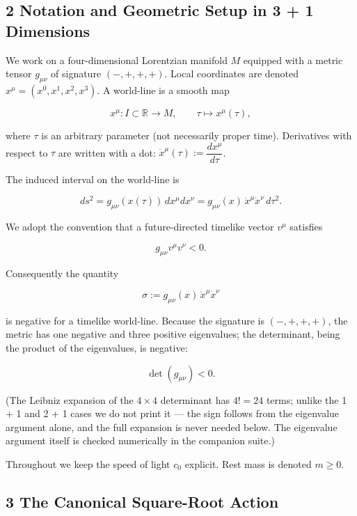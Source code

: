 \documentclass[
]{article}
\begin{document}
\hypertarget{notation-and-geometric-setup-in-3-1-dimensions}{%
\subsection{2 Notation and Geometric Setup in 3 + 1
Dimensions}\label{notation-and-geometric-setup-in-3-1-dimensions}}

We work on a four-dimensional Lorentzian manifold \(M\) equipped with a
metric tensor \(g_{\mu\nu}\) of signature \((-, +, +, +)\). Local
coordinates are denoted \(x^{\mu} = (x^{0}, x^{1}, x^{2}, x^{3})\). A
world-line is a smooth map

\[x^{\mu} : I \subset \mathbb{R} \longrightarrow M, \qquad \tau \longmapsto x^{\mu}(\tau), \tag{1}\]

where \(\tau\) is an arbitrary parameter (not necessarily proper time).
Derivatives with respect to \(\tau\) are written with a dot:
\(\dot{x}^{\mu}(\tau) := \dfrac{dx^{\mu}}{d\tau}\).

The induced interval on the world-line is

\[ds^{2} = g_{\mu\nu}(x(\tau))\, dx^{\mu} dx^{\nu} = g_{\mu\nu}(x)\, \dot{x}^{\mu} \dot{x}^{\nu}\, d\tau^{2}. \tag{2}\]

We adopt the convention that a future-directed timelike vector
\(v^{\mu}\) satisfies

\[g_{\mu\nu} v^{\mu} v^{\nu} < 0. \tag{3}\]

Consequently the quantity

\[\sigma := g_{\mu\nu}(x)\, \dot{x}^{\mu} \dot{x}^{\nu} \tag{4}\]

is negative for a timelike world-line. Because the signature is
\((-,+,+,+)\), the metric has one negative and three positive
eigenvalues; the determinant, being the product of the eigenvalues, is
negative:

\[\det(g_{\mu\nu}) < 0. \tag{5}\]

(The Leibniz expansion of the \(4 \times 4\) determinant has \(4! = 24\)
terms; unlike the 1 + 1 and 2 + 1 cases we do not print it --- the sign
follows from the eigenvalue argument alone, and the full expansion is
never needed below. The eigenvalue argument itself is checked
numerically in the companion suite.)

Throughout we keep the speed of light \(c_{0}\) explicit. Rest mass is
denoted \(m \geq 0\).

\hypertarget{the-canonical-square-root-action}{%
\subsection{3 The Canonical Square-Root
Action}\label{the-canonical-square-root-action}}
\end{document}
